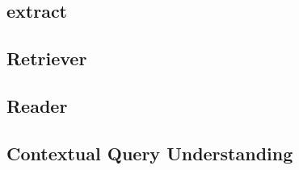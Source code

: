 \subsection{extract}
\label{subsec:extract}

\subsection{Retriever}
\label{subsec:retriever}

\subsection{Reader}
\label{subsec:reader}

\subsection{Contextual Query Understanding}
\label{subsec:cqu}








